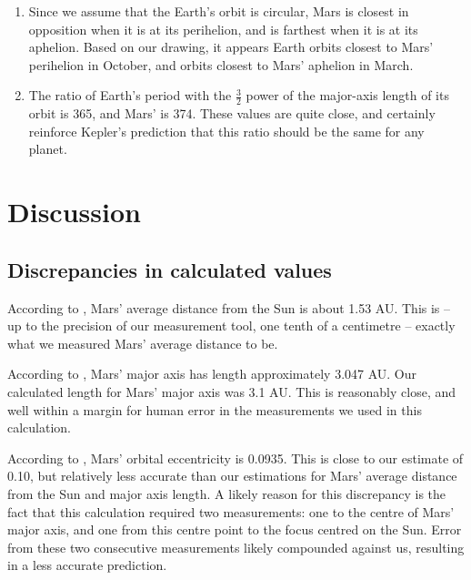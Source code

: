 \documentclass[11pt]{article}
\begin{document}
\begin{enumerate}[label={\textbf{\emph{(\arabic*)}}}]
	\item %
Since we assume that the Earth's orbit is circular, Mars is closest in opposition when it is at its perihelion, and is farthest when it is at its aphelion.
Based on our drawing, it appears Earth orbits closest to Mars' perihelion in October, and orbits closest to Mars' aphelion in March.

	\item %
The ratio of Earth's period with the $\frac{3}{2}$ power of the major-axis length of its orbit is 365, and Mars' is 374.
These values are quite close, and certainly reinforce Kepler's prediction that this ratio should be the same for any planet.

\end{enumerate}


\section{Discussion}
\subsection*{Discrepancies in calculated values}
According to \cite{nasa-mars}, Mars' average distance from the Sun is about 1.53 AU.
This is -- up to the precision of our measurement tool, one tenth of a centimetre -- exactly what we measured Mars' average distance to be.

According to \cite{nasa-mars2}, Mars' major axis has length approximately 3.047 AU.
Our calculated length for Mars' major axis was 3.1 AU.
This is reasonably close, and well within a margin for human error in the measurements we used in this calculation.

According to \cite{nasa-mars2}, Mars' orbital eccentricity is 0.0935.
This is close to our estimate of 0.10, but relatively less accurate than our estimations for Mars' average distance from the Sun and major axis length.
A likely reason for this discrepancy is the fact that this calculation required two measurements: one to the centre of Mars' major axis, and one from this centre point to the focus centred on the Sun.
Error from these two consecutive measurements likely compounded against us, resulting in a less accurate prediction.
\end{document}

